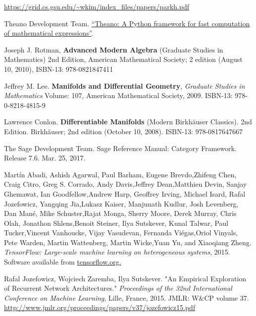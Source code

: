 \documentclass[10pt]{amsart}
\begin{document}
\begin{thebibliography}{9}
\url{https://grid.cs.gsu.edu/~wkim/index_files/papers/parkh.pdf}

Theano Development Team. \href{http://arxiv.org/pdf/1605.02688.pdf}{“Theano: A Python framework for fast computation of mathematical expressions”}. 

Joseph J. Rotman, \textbf{Advanced Modern Algebra} (Graduate Studies in Mathematics) 2nd Edition, American Mathematical Society; 2 edition (August 10, 2010), ISBN-13: 978-0821847411

Jeffrey M. Lee. \textbf{Manifolds and Differential Geometry}, \emph{Graduate Studies in Mathematics} Volume: 107, American Mathematical Society, 2009. ISBN-13: 978-0-8218-4815-9

Lawrence Conlon.  \textbf{Differentiable Manifolds} (Modern Birkhäuser Classics).  2nd Edition.  Birkhäuser; 2nd edition (October 10, 2008).  ISBN-13: 978-0817647667

The Sage Development Team.  Sage Reference Manual: Category Framework.  Release 7.6.  Mar. 25, 2017.  

Martín Abadi, Ashish Agarwal, Paul Barham, Eugene Brevdo,Zhifeng Chen, Craig Citro, Greg S. Corrado, Andy Davis,Jeffrey Dean,Matthieu Devin, Sanjay Ghemawat, Ian Goodfellow,Andrew Harp, Geoffrey Irving, Michael Isard, Rafal Jozefowicz, Yangqing Jia,Lukasz Kaiser, Manjunath Kudlur, Josh Levenberg, Dan Mané, Mike Schuster,Rajat Monga, Sherry Moore, Derek Murray, Chris Olah, Jonathon Shlens,Benoit Steiner, Ilya Sutskever, Kunal Talwar, Paul Tucker,Vincent Vanhoucke, Vijay Vasudevan, Fernanda Viégas,Oriol Vinyals, Pete Warden, Martin Wattenberg, Martin Wicke,Yuan Yu, and Xiaoqiang Zheng.  
\emph{TensorFlow: Large-scale machine learning on heterogeneous systems}, 2015. Software available from \href{http://tensorflow.org/}{tensorflow.org.}

Rafal Jozefowicz, Wojciech Zaremba, Ilya Sutskever.  "An Empirical Exploration of Recurrent Network Architectures."  \emph{Proceedings of the 32nd
International  Conference on  Machine Learning}, Lille, France, 2015.  JMLR: W\&CP volume 37.  \url{http://www.jmlr.org/proceedings/papers/v37/jozefowicz15.pdf} 


  
\end{thebibliography}
\end{document}
